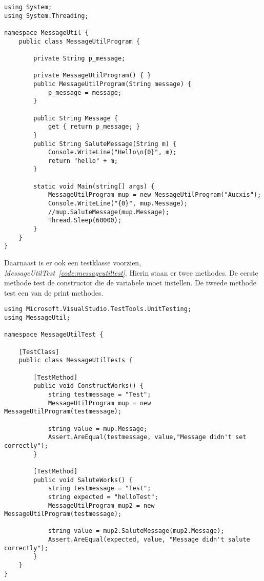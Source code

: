 \begin{lstlisting}
using System;
using System.Threading;

namespace MessageUtil {
    public class MessageUtilProgram {
    
        private String p_message;
        
        private MessageUtilProgram() { }
        public MessageUtilProgram(String message) {
            p_message = message;
        }
        
        public String Message {
            get { return p_message; }
        }
        public String SaluteMessage(String m) {
            Console.WriteLine("Hello\n{0}", m);
            return "hello" + m;
        }
        
        static void Main(string[] args) {
            MessageUtilProgram mup = new MessageUtilProgram("Aucxis");
            Console.WriteLine("{0}", mup.Message);
            //mup.SaluteMessage(mup.Message);
            Thread.Sleep(60000);
        }
    }
}
\end{lstlisting}

Daarnaast is er ook een testklasse voorzien, \emph{MessageUtilTest~\ref{code:messageutiltest}}. Hierin staan er twee methodes. De eerste methode test de constructor die de variabele moet instellen. De tweede methode test een van de print methodes.

\begin{lstlisting}
using Microsoft.VisualStudio.TestTools.UnitTesting;
using MessageUtil;
    
namespace MessageUtilTest {

    [TestClass]
    public class MessageUtilTests {
    
        [TestMethod]
        public void ConstructWorks() {
            string testmessage = "Test";
            MessageUtilProgram mup = new MessageUtilProgram(testmessage);

            string value = mup.Message;
            Assert.AreEqual(testmessage, value,"Message didn't set correctly");
        }
        
        [TestMethod]
        public void SaluteWorks() {
            string testmessage = "Test";
            string expected = "helloTest";
            MessageUtilProgram mup2 = new MessageUtilProgram(testmessage);

            string value = mup2.SaluteMessage(mup2.Message);
            Assert.AreEqual(expected, value, "Message didn't salute correctly");
        }
    }
}
    
\end{lstlisting}

